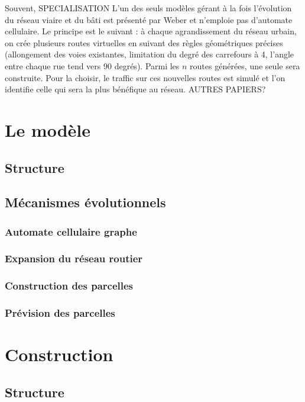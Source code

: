 \documentclass[10pt]{article}
\begin{document}
Souvent, SPECIALISATION L'un des seuls modèles gérant à la fois
l'évolution du réseau viaire et du bâti est présenté par Weber
\cite{Weber2009} et n'emploie pas d'automate cellulaire. Le principe
est le suivant : à chaque agrandissement du réseau urbain, on crée
plusieurs routes virtuelles en suivant des règles géométriques
précises (allongement des voies existantes, limitation du degré des
carrefours à 4, l'angle entre chaque rue tend vers 90 degrés). Parmi
les $n$ routes générées, une seule sera construite. Pour la choisir,
le traffic sur ces nouvelles routes est simulé et l'on identifie celle
qui sera la plus bénéfique au réseau. AUTRES PAPIERS?

\section{Le modèle}

\subsection{Structure}

\subsection{Mécanismes évolutionnels}

\subsubsection{Automate cellulaire graphe}

\subsubsection{Expansion du réseau routier}

\subsubsection{Construction des parcelles}

\subsubsection{Prévision des parcelles}

\section{Construction}

\subsection{Structure}
\end{document}
